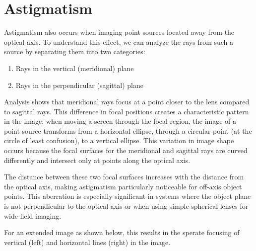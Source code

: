 \documentclass[
  a4paper,
]{book}
\providecommand{\tightlist}{%
  \setlength{\itemsep}{0pt}\setlength{\parskip}{0pt}}
\begin{document}
\section{Astigmatism}\label{astigmatism}

Astigmatism also occurs when imaging point sources located away from the
optical axis. To understand this effect, we can analyze the rays from
such a source by separating them into two categories:

\begin{enumerate}
\def\labelenumi{\arabic{enumi}.}
\tightlist
\item
  Rays in the vertical (meridional) plane
\item
  Rays in the perpendicular (sagittal) plane
\end{enumerate}

Analysis shows that meridional rays focus at a point closer to the lens
compared to sagittal rays. This difference in focal positions creates a
characteristic pattern in the image: when moving a screen through the
focal region, the image of a point source transforms from a horizontal
ellipse, through a circular point (at the circle of least confusion), to
a vertical ellipse. This variation in image shape occurs because the
focal surfaces for the meridional and sagittal rays are curved
differently and intersect only at points along the optical axis.

The distance between these two focal surfaces increases with the
distance from the optical axis, making astigmatism particularly
noticeable for off-axis object points. This aberration is especially
significant in systems where the object plane is not perpendicular to
the optical axis or when using simple spherical lenses for wide-field
imaging.

For an extended image as shown below, this results in the sperate
focusing of vertical (left) and horizontal lines (right) in the image.
\end{document}
